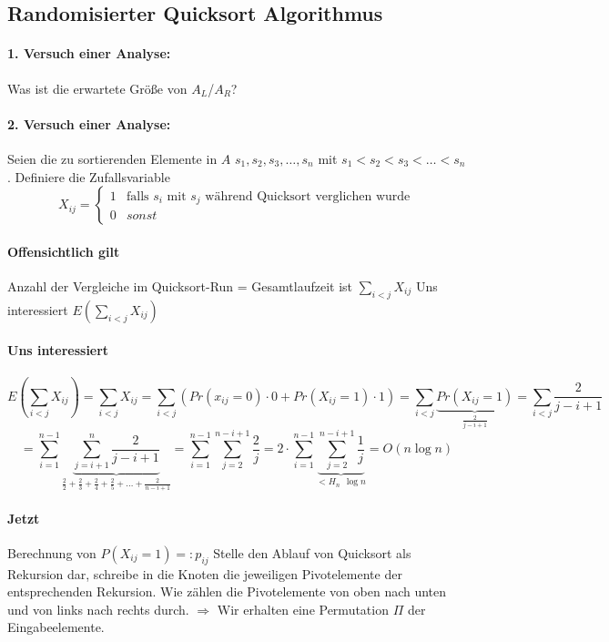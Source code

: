 \subsection{Randomisierter Quicksort Algorithmus}
\paragraph*{1. Versuch einer Analyse:} Was ist die erwartete Größe von $A_L$/$A_R$?

\paragraph*{2. Versuch einer Analyse:} Seien die zu sortierenden Elemente in $A$ $s_1,s_2,s_3,\dots,s_n$ mit $s_1<s_2<s_3<\dots<s_n$.
Definiere die Zufallsvariable
\begin{equation}
   X_{ij} =
   \begin{cases}
     1 & \text{falls } s_i \text{ mit } s_j \text{ während Quicksort verglichen wurde} \\
     0 & sonst
   \end{cases}
\end{equation}
\paragraph*{Offensichtlich gilt} Anzahl der Vergleiche im Quicksort-Run = Gesamtlaufzeit ist $\sum\limits_{i<j} X_{ij}$
Uns interessiert $E(\sum\limits_{i<j} X_{ij})$
\paragraph*{Uns interessiert} $$E(\sum\limits_{i<j} X_{ij})
= \sum\limits_{i<j} X_{ij} 
= \sum\limits_{i<j}(Pr(x_{ij}=0) \cdot 0 + Pr(X_{ij}=1) \cdot 1) 
= \sum\limits_{i<j} \underbrace{Pr(X_{ij}=1)}_{\frac{2}{j-i+1}} 
= \sum\limits_{i<j} \frac{2}{j-i+1}$$
$$= \sum\limits_{i=1}^{n-1} \underbrace{\sum\limits_{j=i+1}^n \frac{2}{j-i+1}}_{\frac{2}{2}+\frac{2}{3}+\frac{2}{4}+\frac{2}{5}+\dots+\frac{2}{n-i+1}} 
= \sum\limits_{i=1}^{n-1} \sum\limits_{j=2}^{n-i+1} \frac{2}{j}
= 2 \cdot \sum\limits_{i=1}^{n-1} \underbrace{\sum\limits_{j=2}^{n-i+1} \frac{1}{j}}_{<H_n~~\log n} 
= O(n \log n) $$ %

\paragraph*{Jetzt} Berechnung von $P(X_{ij}=1) =: p_{ij}$ Stelle den Ablauf von Quicksort als Rekursion dar, schreibe in die Knoten die jeweiligen Pivotelemente der entsprechenden Rekursion. Wie zählen die Pivotelemente von oben nach unten und von links nach rechts durch. $\Rightarrow$ Wir erhalten eine Permutation $\Pi$ der Eingabeelemente.

